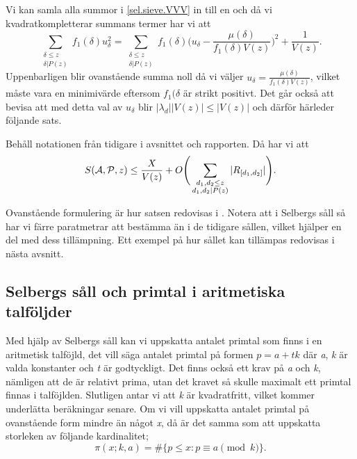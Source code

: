 Vi kan samla alla summor i \eqref{sel.sieve.VVV} in till en och då vi kvadratkompletterar summans termer har vi att
\begin{equation}
    \sum_{\substack{\delta \leq z\\ \delta | P(z)}}f_1(\delta) u_\delta^2 = \sum_{\substack{\delta\leq z\\\delta|P(z)}}f_1(\delta)\Bigg(u_\delta - \frac{\mu(\delta)}{f_1(\delta)V(z)}\Bigg)^2 + \frac{1}{V(z)}.\nonumber
\end{equation}
Uppenbarligen blir ovanstående summa noll då vi väljer \(u_\delta = \frac{\mu(\delta)}{f_1(\delta)V(z)}\), vilket måste vara en minimivärde eftersom \(f_1(\delta\) är strikt positivt.
Det går också att bevisa att med detta val av \(u_\delta\) blir \(|\lambda_d||V(z)| \leq |V(z)|\) \cite[s. 122-123]{cojocarumurty} och därför härleder följande sats.
\begin{theorem}\label{sel.sieve.thm}
Behåll notationen från tidigare i avsnittet och rapporten. Då har vi att
\begin{equation}
    S(\mathcal{A}, \mathcal{P}, z) \leq \frac{X}{V(z)} + O\Bigg(\sum_{\substack{d_1,d_2\leq z\\d_1,d_2\mid P(z)}}|R_{[d_1, d_2]}|\Bigg).\nonumber
\end{equation}
\end{theorem}
Ovanstående formulering är hur satsen redovisas i \cite[sats 7.2.1]{cojocarumurty}.
Notera att i Selbergs såll så har vi färre paratmetrar att bestämma än i de tidigare sållen, vilket hjälper en del med dess tillämpning. 
Ett exempel på hur sållet kan tillämpas redovisas i nästa avsnitt.

\subsection{Selbergs såll och primtal i aritmetiska talföljder}\label{sel.apl}

Med hjälp av Selbergs såll kan vi uppskatta antalet primtal som finns i en aritmetisk talföjld, det vill säga antalet primtal på formen \(p = a + tk\) där \textit{a}, \textit{k} är valda konstanter och \textit{t} är godtyckligt. 
Det finns också ett krav på \textit{a} och \textit{k}, nämligen att de är relativt prima, utan det kravet så skulle maximalt ett primtal finnas i talföjlden. 
Slutligen antar vi att \textit{k} är kvadratfritt, vilket kommer underlätta beräkningar senare.
Om vi vill uppskatta antalet primtal på ovanstående form mindre än något \textit{x}, då är det samma som att uppskatta storleken av följande kardinalitet;
\begin{equation}
    \pi(x;k,a) = \#\{p\leq x: p \equiv a \pmod{k}\}.\label{sel.apl.arithPrimes}
\end{equation}

